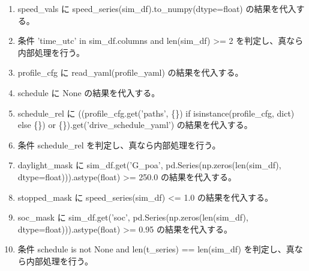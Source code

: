 \documentclass[a4paper,11pt]{article}
\begin{document}
            \begin{enumerate}[leftmargin=1.8em]
            \item speed\_vals に speed\_series(sim\_df).to\_numpy(dtype=float) の結果を代入する。
\item 条件 'time\_utc' in sim\_df.columns and len(sim\_df) >= 2 を判定し、真なら内部処理を行う。
\item profile\_cfg に read\_yaml(profile\_yaml) の結果を代入する。
\item schedule に None の結果を代入する。
\item schedule\_rel に ((profile\_cfg.get('paths', \{\}) if isinstance(profile\_cfg, dict) else \{\}) or \{\}).get('drive\_schedule\_yaml') の結果を代入する。
\item 条件 schedule\_rel を判定し、真なら内部処理を行う。
\item daylight\_mask に sim\_df.get('G\_poa', pd.Series(np.zeros(len(sim\_df), dtype=float))).astype(float) >= 250.0 の結果を代入する。
\item stopped\_mask に speed\_series(sim\_df) <= 1.0 の結果を代入する。
\item soc\_mask に sim\_df.get('soc', pd.Series(np.zeros(len(sim\_df), dtype=float))).astype(float) >= 0.95 の結果を代入する。
\item 条件 schedule is not None and len(t\_series) == len(sim\_df) を判定し、真なら内部処理を行う。
            \end{enumerate}
\end{document}
